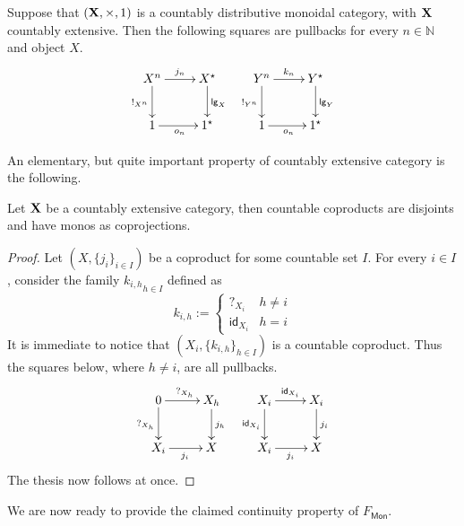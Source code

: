 \documentclass[runningheads,envcountsect]{llncs}
\newcommand{\lgh}{\mathsf{lg}}
\def\X{\textbf {\textup{X}}}
\newcommand{\mo}[1]{{#1}_\mathsf{Mon}}
\newcommand{\id}[1]{\mathsf{id}_{#1}}
\begin{document}
\begin{remark}\label{rem:pb}
Suppose that  $(\X, \times, 1)$ is a countably distributive monoidal category, with $\X$ countably extensive. Then the following squares are pullbacks for every $n\in \mathbb{N}$ and object $X$.
\[\xymatrix{X^{n} \ar[r]^-{j_n} \ar[d]_{!_{X^n}}& X^\star \ar[d]^{\lgh_X} & Y^{n} \ar[r]^-{k_n} \ar[d]_{!_{Y^n}}& Y^\star \ar[d]^{\lgh_Y}\\ 1 \ar[r]_{o_n}&  1^\star & 1 \ar[r]_{o_n}&  1^\star}\]
\end{remark}

An elementary, but quite important property of countably extensive category is the following.

\begin{proposition}\label{prop:inj}
Let $\X$ be a countably extensive category, then countable coproducts are disjoints and have monos as coprojections. 
\end{proposition}
\begin{proof}
Let $(X, \{j_i\}_{i\in I})$ be a coproduct for some countable set $I$. For every $i\in I$, consider the family ${k_{i, h}}_{h\in I}$ defined as
\[k_{i, h}:=\begin{cases}
	?_{X_{i}} & h\neq i\\
	\id{X_i} &h=i
\end{cases}\]
It is immediate to notice that $(X_{i}, \{k_{i,h}\}_{h\in I})$ is a countable coproduct. Thus the squares below, where $h\neq i$, are all pullbacks.
	\[\xymatrix{0 \ar[r]^{?_{X_h}} \ar[d]_{?_{X_h}}& X_h \ar[d]^{j_h} & X_i \ar[r]^{\id{X_i}} \ar[d]_{\id{X_i}}& X_i \ar[d]^{j_i}\\ X_i \ar[r]_{j_i} & X & X_i \ar[r]_{j_i} & X}\]
	The thesis now follows at once.
\end{proof}

We are now ready to provide the claimed continuity property of $\mo{F}$.
\end{document}
